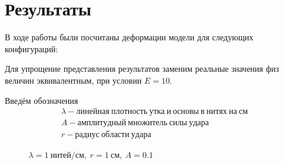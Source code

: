 \chapter{Результаты}\label{ch:results}
В ходе работы были посчитаны деформации модели для следующих конфигураций:

Для упрощение представления результатов заменим реальные значения физ величин эквивалентным, при условии $E=10$.

Введём обозначения
\begin{gather*}
    \lambda - линейная~плотность~утка~и~основы~в~нитях~на~см \\
    A - амплитудный~множитель~силы~удара \\
    r - радиус~области~удара
\end{gather*}

\begin{figure}[H]
    \centering
    \caption{$\lambda=1~нитей/см,~r=1~см,~A=0.1$}


\end{figure}
